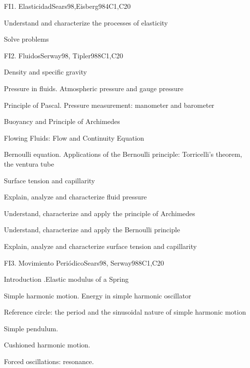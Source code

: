 \begin{syllabus}
\begin{unit}{FI1. Elasticidad}{}{Sears98,Eisberg98}{4}{C1,C20}
   \begin{learningoutcomes}
         \item  Understand and characterize the processes of elasticity
         \item  Solve problems
   \end{learningoutcomes}
\end{unit}

\begin{unit}{FI2. Fluidos}{}{Serway98, Tipler98}{8}{C1,C20}
\begin{topics}
         \item  Density and specific gravity
	 \item  Pressure in fluids. Atmospheric pressure and gauge pressure
         \item  Principle of Pascal. Pressure measurement: manometer and barometer
	 \item  Buoyancy and Principle of Archimedes
         \item  Flowing Fluids: Flow and Continuity Equation
	 \item  Bernoulli equation. Applications of the Bernoulli principle: Torricelli's theorem, the ventura tube
         \item  Surface tension and capillarity
   \end{topics}

   \begin{learningoutcomes}
         \item  Explain, analyze and characterize fluid pressure
         \item  Understand, characterize and apply the principle of Archimedes
         \item  Understand, characterize and apply the Bernoulli principle
         \item  Explain, analyze and characterize surface tension and capillarity
   \end{learningoutcomes}
\end{unit}

\begin{unit}{FI3. Movimiento Periódico}{}{Sears98, Serway98}{8}{C1,C20}
\begin{topics}
         \item  Introduction .Elastic modulus of a Spring
	 \item  Simple harmonic motion. Energy in simple harmonic oscillator
         \item  Reference circle: the period and the sinusoidal nature of simple harmonic motion
	 \item  Simple pendulum.
         \item  Cushioned harmonic motion.
         \item  Forced oscillations: resonance.
   \end{topics}


\end{unit}
\end{syllabus}
